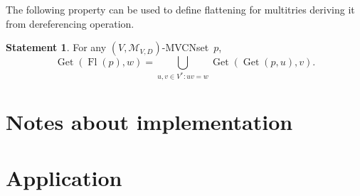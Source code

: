 \documentclass{article}
\theoremstyle{definition}
\newtheorem{St}{Statement}
\newcommand{\setcharmvcn}{M}
\newcommand{\setsymbol}[3]{\mathcal{#1}_{#2,#3}}
\newcommand{\setmvcn}[2]{\setsymbol{\setcharmvcn}{#1}{#2}}
\newcommand{\flatten}{\operatorname{Fl}}
\newcommand{\deref}{\operatorname{Get}}
\begin{document}
The following property can be used to define flattening for multitries
deriving it from dereferencing operation.
\begin{St}\label{st:deref-flatten}
For any $(V,\setmvcn{V}{D})$-MVCNset~$p$,
\[
  \deref(\flatten(p), w) =
      \bigcup_{u,v\in V^\ast: uv = w}
        \deref(\deref(p, u), v) .
\]
\end{St}

\section{Notes about implementation}

\section{Application}
\end{document}

